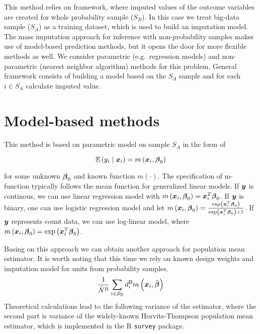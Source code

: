 \documentclass[
  letterpaper,
  DIV=11,
  numbers=noendperiod]{scrreprt}
\begin{document}
This method relies on framework, where imputed values of the outcome
variables are created for whole probability sample (\(S_B\)). In this
case we treat big-data sample (\(S_A\)) as a training dataset, which is
used to build an imputation model. The mass imputation approach for
inference with non-probability samples makes use of model-based
prediction methods, but it opens the door for more flexible methods as
well. We consider parametric (e.g.~regression models) and non-parametric
(nearest neighbor algorithm) methods for this problem. General framework
consists of building a model based on the \(S_A\) sample and for each
\(i \in S_A\) calculate imputed value.

\hypertarget{model-based-methods}{%
\section{Model-based methods}\label{model-based-methods}}

This method is based on parametric model on sample \(S_A\) in the form
of

\[
\begin{equation}
\mathbb{E}\left(y_i \mid \bx_i\right) = m\left(\bx_i, \bbeta_{0}\right)
\end{equation}
\]

for some unknown \(\boldsymbol{\beta}_{0}\) and known function \(m(\cdot)\). The
specification of m-function typically follows the mean function for
generalized linear models. If \(\boldsymbol{y}\) is continous, we can use linear
regression model with
\(m\left(\boldsymbol{x}_i, \boldsymbol{\beta}_{0}\right) = \boldsymbol{x}_i^{T} \boldsymbol{\beta}_0\). If
\(\boldsymbol{y}\) is binary, one can use logistic regression model and let
\(m\left(\boldsymbol{x}_i, \boldsymbol{\beta}_{0}\right) = \frac{\exp\left( \boldsymbol{x}_i^{T} \boldsymbol{\beta}_0\right)}{\exp\left( \boldsymbol{x}_i^{T} \boldsymbol{\beta}_0\right) + 1}\).
If \(\boldsymbol{y}\) represents count data, we can use log-linear model, where
\(m\left(\boldsymbol{x}_i, \boldsymbol{\beta}_{0}\right) = \exp\left(\boldsymbol{x}_i^{T} \boldsymbol{\beta}_0\right)\).

Basing on this approach we can obtain another approach for population
mean estimator. It is worth noting that this time we rely on known
design weights and imputation model for units from probability samples.
\[
\begin{equation}
\frac{1}{\hat{N}^{\mathrm{B}}} \sum_{i \in \mathcal{S}_{\mathrm{B}}} d_i^{\mathrm{B}} m\left(\boldsymbol{x}_i, \hat{\bbeta}\right)
\end{equation}
\] Theoretical calculations lead to the following variance of the
estimator, where the second part is variance of the widely-known
Horvits-Thompson population mean estimator, which is implemented in the
R \texttt{survey} package.
\end{document}
